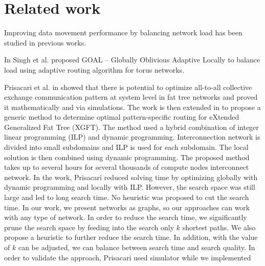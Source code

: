 \section{Related work}
\label{sec:relatedwork}

Improving data movement performance by balancing network load has been studied in previous works. 

In \cite{singh2003:GOAL} Singh et al. proposed GOAL -- Globally Oblivious Adaptive Locally to balance load using adaptive routing algorithm for torus networks.



Prisacari et al. in \cite{Prisacari13a} showed that there is potential to optimize all-to-all collective exchange communication pattern at system level in fat tree networks and proved it mathematically and via simulations. The work is then extended in \cite{Prisacari13b} to propose a generic method to determine optimal pattern-specific routing for eXtended Generalized Fat Tree (XGFT). The method used a hybrid combination of integer linear programming (ILP) and dynamic programming. Interconnection network is divided into small subdomains and ILP is used for each subdomain. The local solution is then combined using dynamic programming. The proposed method takes up to several hours for several thousands of compute nodes interconnect network. In the work, Prisacari reduced solving time by optimizing globally with dynamic programming and locally with ILP. However, the search space was still large and led to long search time. No heuristic was proposed to cut the search time. In our work, we present networks as graphs, so our approaches can work with any type of network. In order to reduce the search time, we significantly prune the search space by feeding into the search only $k$ shortest paths. We also propose a heuristic to further reduce the search time. In addition, with the value of $k$ can be adjusted, we can balance between search time and search quality. In order to validate the approach, Prisacari used simulator while we implemented 

